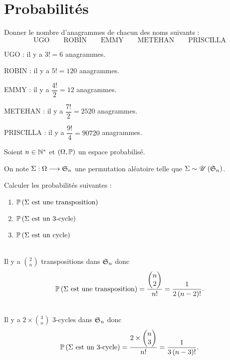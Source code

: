 \chapter{Probabilités}

\minitoc

\begin{exo}[Exercice 1]
Donner le nombre d'anagrammes de chacun des noms suivants : \[\text{UGO}\qquad\text{ROBIN}\qquad\text{EMMY}\qquad\text{METEHAN}\qquad\text{PRISCILLA}\]
\end{exo}

\begin{corr}
UGO : il y a \(3!=6\) anagrammes.

ROBIN : il y a \(5!=120\) anagrammes.

EMMY : il y a \(\dfrac{4!}{2}=12\) anagrammes.

METEHAN : il y a \(\dfrac{7!}{2}=2520\) anagrammes.

PRISCILLA : il y a \(\dfrac{9!}{4}=90720\) anagrammes.
\end{corr}

\begin{exo}[Exercice 2]
Soient \(n\in\Ns\) et \(\groupe{\Omega}[\prem]\) un espace probabilisé.

On note \(\Sigma:\Omega\to\S{n}\) une permutation aléatoire telle que \(\Sigma\sim\loiuniforme{\S{n}}\).

Calculer les probabilités suivantes :

\begin{enumerate}
    \item \(\proba{\Sigma\text{ est une transposition}}\) \\
    \item \(\proba{\Sigma\text{ est un 3-cycle}}\) \\
    \item \(\proba{\Sigma\text{ est un cycle}}\)
\end{enumerate}
\end{exo}

\begin{corr}[1]~\\
Il y a \(\binom{2}{n}\) transpositions dans \(\S{n}\) donc \[\proba{\Sigma\text{ est une transposition}}=\dfrac{\binom{2}{n}}{n!}=\dfrac{1}{2\paren{n-2}!}.\]
\end{corr}

\begin{corr}[2]~\\
Il y a \(2\times\binom{3}{n}\) \(3\)-cycles dans \(\S{n}\) donc \[\proba{\Sigma\text{ est un 3-cycle}}=\dfrac{2\times\binom{3}{n}}{n!}=\dfrac{1}{3\paren{n-3}!}.\]
\end{corr}

